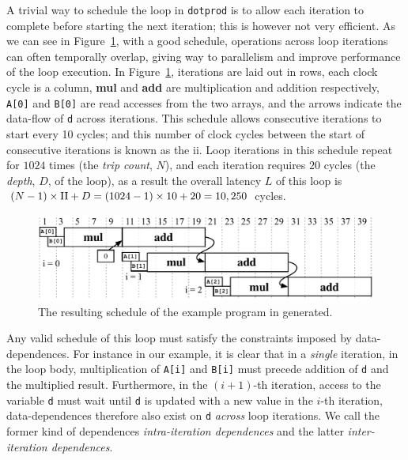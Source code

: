 A trivial way to schedule the loop in \verb|dotprod| is to allow each iteration
to complete before starting the next iteration; this is however not very
efficient.  As we can see in Figure~\ref{bg:fig:schedule}, with a good
schedule, operations across loop iterations can often temporally overlap,
giving way to parallelism and improve performance of the loop execution.  In
Figure~\ref{bg:fig:schedule}, iterations are laid out in rows, each clock cycle
is a column, \textbf{mul} and \textbf{add} are multiplication and addition
respectively, \verb|A[0]| and \verb|B[0]| are read accesses from the two
arrays, and the arrows indicate the data-flow of \verb|d| across iterations.
This schedule allows consecutive iterations to start every 10 cycles; and this
number of clock cycles between the start of consecutive iterations is known
as the \gls{ii}\@.  Loop iterations in this schedule repeat for $1024$ times
(the \emph{trip count}, $N$), and each iteration requires $20$ cycles (the
\emph{depth}, $D$, of the loop), as a result the overall latency $L$ of this
loop is $(N - 1) \times \mathrm{II} + D = (1024 - 1) \times 10 + 20 = 10,250$ cycles.
\begin{figure}[ht]
    \centering
    \includegraphics[width=0.8\linewidth]{bg/fig/schedule}
    \caption{%
        The resulting schedule of the example program in generated.
    }\label{bg:fig:schedule}
\end{figure}

Any valid schedule of this loop must satisfy the constraints imposed by
data-dependences.  For instance in our example, it is clear that in a
\emph{single} iteration, in the loop body, multiplication of \verb|A[i]|
and \verb|B[i]| must precede addition of \verb|d| and the multiplied
result.  Furthermore, in the $(i + 1)$-th iteration, access to the variable
\verb|d| must wait until \verb|d| is updated with a new value in the $i$-th
iteration, data-dependences therefore also exist on \verb|d| \emph{across}
loop iterations.  We call the former kind of dependences \emph{intra-iteration
dependences} and the latter \emph{inter-iteration dependences}.

